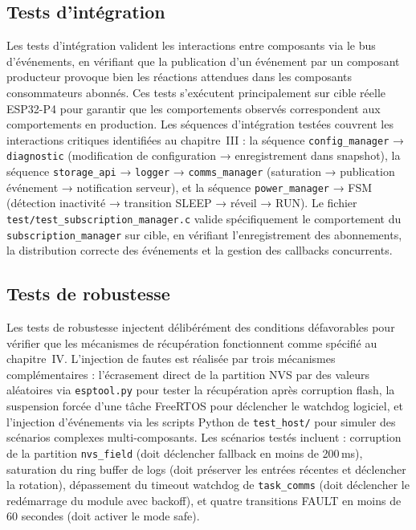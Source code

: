 \subsection{Tests d'intégration}
\label{subsec:integ}

Les tests d'intégration valident les interactions entre composants
via le bus d'événements, en vérifiant que la publication d'un événement
par un composant producteur provoque bien les réactions attendues dans
les composants consommateurs abonnés. Ces tests s'exécutent
principalement sur cible réelle ESP32-P4 pour garantir que les
comportements observés correspondent aux comportements en production.
Les séquences d'intégration testées couvrent les interactions critiques
identifiées au chapitre~III : la séquence \texttt{config\_manager}
→ \texttt{diagnostic} (modification de configuration → enregistrement
dans snapshot), la séquence \texttt{storage\_api} → \texttt{logger}
→ \texttt{comms\_manager} (saturation → publication événement →
notification serveur), et la séquence \texttt{power\_manager} → FSM
(détection inactivité → transition SLEEP → réveil → RUN). Le fichier
\texttt{test/test\_subscription\_manager.c} valide spécifiquement le
comportement du \texttt{subscription\_manager} sur cible, en vérifiant
l'enregistrement des abonnements, la distribution correcte des
événements et la gestion des callbacks concurrents.

\subsection{Tests de robustesse}
\label{subsec:robust}

Les tests de robustesse injectent délibérément des conditions
défavorables pour vérifier que les mécanismes de récupération
fonctionnent comme spécifié au chapitre~IV. L'injection de fautes
est réalisée par trois mécanismes complémentaires : l'écrasement
direct de la partition NVS par des valeurs aléatoires via
\texttt{esptool.py} pour tester la récupération après corruption
flash, la suspension forcée d'une tâche FreeRTOS pour déclencher
le watchdog logiciel, et l'injection d'événements via les scripts
Python de \texttt{test\_host/} pour simuler des scénarios complexes
multi-composants. Les scénarios testés incluent : corruption de la
partition \texttt{nvs\_field} (doit déclencher fallback en moins de
200\,ms), saturation du ring buffer de logs (doit préserver les
entrées récentes et déclencher la rotation), dépassement du timeout
watchdog de \texttt{task\_comms} (doit déclencher le redémarrage du
module avec backoff), et quatre transitions FAULT en moins de 60
secondes (doit activer le mode safe).

